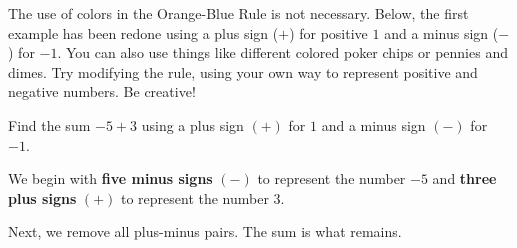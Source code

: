 \documentclass{ximera}[font=12pt]
\begin{document}
The use of colors in the Orange-Blue Rule is not necessary. Below, the first example has been redone using a plus sign ($+$) for 
positive $1$ and a minus sign ($-$) for $-1.$  You can also use things like different colored poker chips or
pennies and dimes.  Try modifying the rule, using your own way to represent positive and negative 
numbers.  Be creative!


\begin{example} 
    
    Find the sum $-5+3$ using a plus sign $(+)$ for $1$ and a minus sign $(-)$ for $-1.$
    
\begin{explanation}

    We begin with \textbf{five minus signs} $(-)$ to represent the number $-5$ and 
    \textbf{three plus signs} $(+)$ to represent the number $3.$  
    
    
\begin{center}
\end{center}

Next, we remove all plus-minus pairs.  The sum is what remains.

\begin{center}
\end{center}
\end{explanation}
\end{example}
\end{document}
